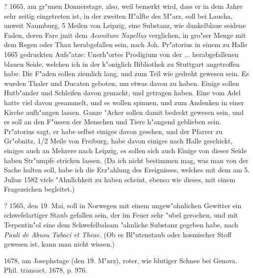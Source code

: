 \documentclass[a4paper, 11pt, oneside, polutonikogreek, german]{article}
\begin{document}
? 1665, am gr"unen Donnerstage, also, weil bemerkt wird, dass er in dem Jahre sehr zeitig eingetreten ist, in der zweiten H"alfte des M"arz, soll bei Laucha, unweit Naumburg, 5 Meilen von Leipzig, eine Substanz, wie dunkelblaue seidene Faden, deren Fare jmit dem \emph{Aconitum Napellus} verglichen, in gro"ser Menge mit dem Regen oder Thau herabgefallen sein, nach Joh. Pr"atorius in einem zu Halle 1665 gedruckten Aufs"atze: Unerh"ortes Prodigium von der ... herabgefallenen blauen Seide, welchen ich in der k"oniglich Bibliothek zu Stuttgart angetroffen habe. Die F"aden sollen ziemlich lang, und zum Teil wie gedreht gewesen sein. Es wurden Thaler und Ducaten geboten, um etwas davon zu haben. Einige sollen Hutb"ander und Schleifen davon gemacht, und getragen haben. Eine vom Adel hatte viel davon gesammelt, und es wollen spinnen, und zum Andenken in einer Kirche aufh"angen lassen. Ganze "Acker sollen damit bedeckt gewesen sein, und es soll an den F"ussen der Menschen und Tiere h"angend geblieben sein. Pr"atorius sagt, er habe selbst einiges davon gesehen, und der Pfarrer zu Gr"obnitz, 1/2 Meile von Freiburg, habe davon einiges nach Halle geschickt, einiges auch an Mehrere nach Leipzig, es sollen sich auch Einige von dieser Seide haben Str"umpfe stricken lassen. (Da ich nicht bestimmen mag, was man von der Sache halten soll, habe ich die Erz"ahlung des Ereignisses, welches mit dem am 5. Julius 1582 viele "Ahnlichkeit zu haben scheint, ebenso wie dieses, mit einem Fragezeichen begleitet.)

? 1565, den 19. Mai, soll in Norwegen mit einem ungew"ohnlichen Gewitter ein schwefelartiger Staub gefallen sein, der im Feuer sehr "ubel gerochen, und mit Terpentin"ol eine dem Schwefelbalsam "ahnliche Substanz gegeben habe, nach \emph{Pauli de Abusu Tabaci et Theae}. (Ob es Bl"utenstaub oder kosmischer Stoff gewesen ist, kann man nicht wissen.)

1678, am Josephstage (den 19. M"arz), roter, wie blutiger Schnee bei Genova. Phil. transact. 1678, p. 976.
\end{document}
